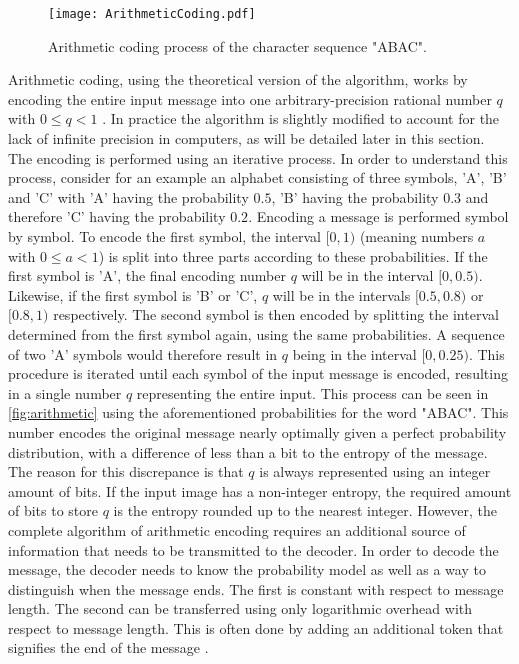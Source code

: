 \begin{figure}
\centering
\texttt{[image: ArithmeticCoding.pdf]}
\caption{Arithmetic coding process of the character sequence "ABAC".}
\label{fig:arithmetic}
\end{figure}

Arithmetic coding, using the theoretical version of the algorithm, works by encoding the entire input message into one arbitrary-precision rational number $q$ with $0 \leq q < 1$ \citep{said_introduction_2023}. In practice the algorithm is slightly modified to account for the lack of infinite precision in computers, as will be detailed later in this section. The encoding is performed using an iterative process. In order to understand this process, consider for an example an alphabet consisting of three symbols, 'A', 'B' and 'C' with 'A' having the probability $0.5$, 'B' having the probability $0.3$ and therefore 'C' having the probability $0.2$. Encoding a message is performed symbol by symbol. To encode the first symbol, the interval $[0,1)$ (meaning numbers $a$ with $0 \leq a < 1$) is split into three parts according to these probabilities. If the first symbol is 'A', the final encoding number $q$ will be in the interval $[0,0.5)$. Likewise, if the first symbol is 'B' or 'C', $q$ will be in the intervals $[0.5,0.8)$ or $[0.8,1)$ respectively. The second symbol is then encoded by splitting the interval determined from the first symbol again, using the same probabilities. A sequence of two 'A' symbols would therefore result in $q$ being in the interval $[0,0.25)$. This procedure is iterated until each symbol of the input message is encoded, resulting in a single number $q$ representing the entire input. This process can be seen in \autoref{fig:arithmetic} using the aforementioned probabilities for the word "ABAC". This number encodes the original message nearly optimally given a perfect probability distribution, with a difference of less than a bit to the entropy of the message. The reason for this discrepance is that $q$ is always represented using an integer amount of bits. If the input image has a non-integer entropy, the required amount of bits to store $q$ is the entropy rounded up to the nearest integer. However, the complete algorithm of arithmetic encoding requires an additional source of information that needs to be transmitted to the decoder. In order to decode the message, the decoder needs to know the probability model as well as a way to distinguish when the message ends. The first is constant with respect to message length. The second can be transferred using only logarithmic overhead with respect to message length. This is often done by adding an additional token that signifies the end of the message \citep{said_introduction_2023}.

